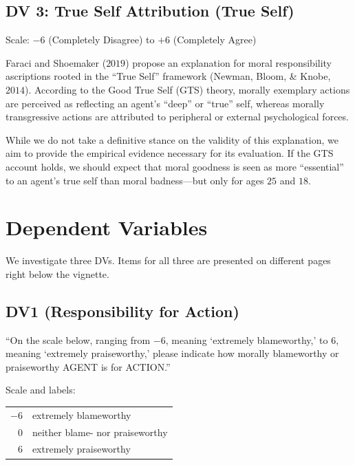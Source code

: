 \documentclass[scrarticle]{scrartcl}
\begin{document}
\subsection*{DV 3: True Self Attribution (True Self)}
Scale: $-6$ (Completely Disagree) to $+6$ (Completely Agree)

\vspace{0.75em}
\noindent Faraci and Shoemaker ($2019$) propose an explanation for moral responsibility ascriptions rooted in the \enquote{True Self} framework (Newman, Bloom, \& Knobe, $2014$).
According to the Good True Self (GTS) theory, morally exemplary actions are perceived as reflecting an agent's \enquote{deep} or \enquote{true} self, whereas morally transgressive actions are attributed to peripheral or external psychological forces.

While we do not take a definitive stance on the validity of this explanation, we aim to provide the empirical evidence necessary for its evaluation.
If the GTS account holds, we should expect that moral goodness is seen as more \enquote{essential} to an agent's true self than moral badness---but only for ages $25$ and $18$.


\section{Dependent Variables}
We investigate three DVs.
Items for all three are presented on different pages right below the vignette.


\subsection*{DV1 (Responsibility for Action)}
\enquote{On the scale below, ranging from $-6$, meaning \enquote{extremely blameworthy,} to $6$, meaning \enquote{extremely praiseworthy,} please indicate how morally blameworthy or praiseworthy AGENT is for ACTION.}

\vspace{0.75em}
\noindent Scale and labels:

\vspace{0.75em}
\begin{tabular}{r @{ = } l}
   $-6$   & extremely blameworthy             \\
    $0$   & neither blame- nor praiseworthy   \\
    $6$   & extremely praiseworthy            \\
\end{tabular}
\end{document}
